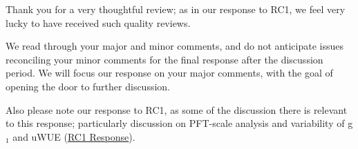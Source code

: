 \documentclass[12pt]{article}
\begin{document}
Thank you for a very thoughtful review; as in our response to RC1, we
feel very lucky to have received such quality reviews.

We read through your major and minor comments, and do not anticipate
issues reconciling your minor comments for the final response after
the discussion period. We will focus our response on your major
comments, with the goal of opening the door to further discussion.

Also please note our response to RC1, as some of the discussion there
is relevant to this response; particularly discussion on PFT-scale
analysis and variability of g$_1$ and uWUE
(\href{https://editor.copernicus.org/index.php/hess-2018-553-AC1.pdf?_mdl=msover_md&_jrl=13&_lcm=oc108lcm109w&_acm=get_comm_file&_ms=72556&c=153745&salt=17166479111051651323}{RC1
Response}).
\end{document}
